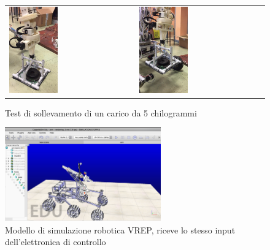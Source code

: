 \documentclass[%
corpo=11pt,
twoside,
 stile=classica,
oldstyle,
greek,%
]{toptesi}
\begin{document}
\begin{figure}
	\centering
	\begin{tabular}{ll}
		\includegraphics[width=0.4\textwidth]{image/5kg1.png}
		&
		\includegraphics[width=0.4\textwidth]{image/5kg2.png}
	\end{tabular}
	\caption{Test di sollevamento di un carico da 5 chilogrammi}
	\label{fig:test1}
\end{figure}
\begin{figure}
	\centering
		\includegraphics[width=0.6\textwidth]{Screen/coppelia.png}
	\caption{Modello di simulazione robotica VREP, riceve lo stesso input dell'elettronica di controllo}
	\label{fig:coppelia}
\end{figure}
\end{document}
